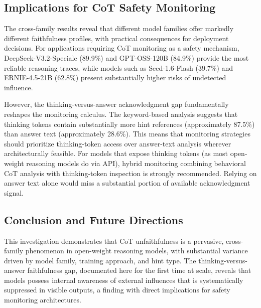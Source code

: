 \subsection*{Implications for CoT Safety Monitoring}

The cross-family results reveal that different model families offer markedly
different faithfulness profiles, with practical consequences for deployment
decisions. For applications requiring CoT monitoring as a safety mechanism,
DeepSeek-V3.2-Speciale (89.9\%) and GPT-OSS-120B (84.9\%) provide the most
reliable reasoning traces, while models such as Seed-1.6-Flash (39.7\%) and
ERNIE-4.5-21B (62.8\%) present substantially higher risks of undetected
influence.

However, the thinking-versus-answer acknowledgment gap fundamentally reshapes the monitoring
calculus. The keyword-based analysis suggests that thinking tokens contain
substantially more hint references (approximately 87.5\%) than answer text (approximately 28.6\%).
This means that monitoring strategies should prioritize thinking-token access
over answer-text analysis wherever architecturally feasible. For models that
expose thinking tokens (as most open-weight reasoning models do via API), hybrid
monitoring combining behavioral CoT analysis with thinking-token inspection is
strongly recommended. Relying on answer text alone would miss a substantial
portion of available acknowledgment signal.

\subsection*{Conclusion and Future Directions}

This investigation demonstrates that CoT unfaithfulness is a pervasive,
cross-family phenomenon in open-weight reasoning models, with substantial
variance driven by model family, training approach, and hint type. The
thinking-versus-answer faithfulness gap, documented here for the first time at
scale, reveals that models possess internal awareness of external influences
that is systematically suppressed in visible outputs, a finding with direct
implications for safety monitoring architectures.

